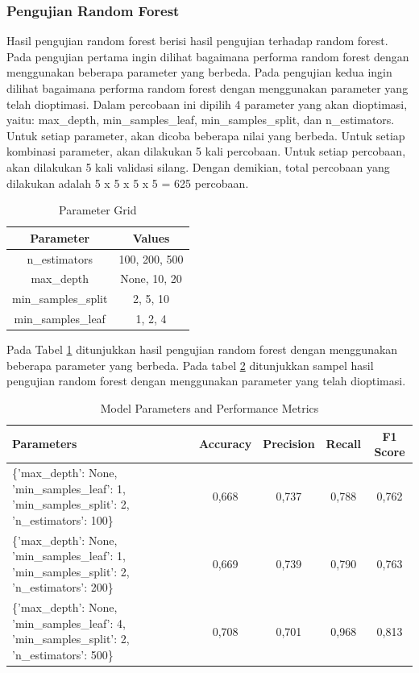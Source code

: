 \subsubsection{Pengujian Random Forest}
Hasil pengujian random forest berisi hasil pengujian terhadap random forest. Pada pengujian pertama ingin dilihat bagaimana performa random forest dengan menggunakan beberapa parameter yang berbeda. Pada pengujian kedua ingin dilihat bagaimana performa random forest dengan menggunakan parameter yang telah dioptimasi.
Dalam percobaan ini dipilih 4 parameter yang akan dioptimasi, yaitu: max\_depth, min\_samples\_leaf, min\_samples\_split, dan n\_estimators. Untuk setiap parameter, akan dicoba beberapa nilai yang berbeda. Untuk setiap kombinasi parameter, akan dilakukan 5 kali percobaan. Untuk setiap percobaan, akan dilakukan 5 kali validasi silang. Dengan demikian, total percobaan yang dilakukan adalah 5 x 5 x 5 x 5 = 625 percobaan.

\begin{table}[h]
    \centering
    \begin{tabular}{|c|c|}
    \hline
    \textbf{Parameter} & \textbf{Values} \\
    \hline
    n\_estimators & 100, 200, 500 \\
    \hline
    max\_depth & None, 10, 20 \\
    \hline
    min\_samples\_split & 2, 5, 10 \\
    \hline
    min\_samples\_leaf & 1, 2, 4 \\
    \hline
    \end{tabular}
    \caption{Parameter Grid}
    \label{table:param_grid}
    \end{table}

Pada Tabel \ref{table:param_grid} ditunjukkan hasil pengujian random forest dengan menggunakan beberapa parameter yang berbeda. Pada tabel \ref{table:sampel_hasil_pengujian_random_forest} ditunjukkan sampel hasil pengujian random forest dengan menggunakan parameter yang telah dioptimasi.


\begin{table}[h]
    \centering
    \begin{tabularx}{\textwidth}{|X|c|c|c|c|}
    \hline
    \textbf{Parameters} & \textbf{Accuracy} & \textbf{Precision} & \textbf{Recall} & \textbf{F1 Score} \\
    \hline
    \{'max\_depth': None, 'min\_samples\_leaf': 1, 'min\_samples\_split': 2, 'n\_estimators': 100\} & 0,668 & 0,737 & 0,788 & 0,762 \\
    \hline
    \{'max\_depth': None, 'min\_samples\_leaf': 1, 'min\_samples\_split': 2, 'n\_estimators': 200\} & 0,669 & 0,739 & 0,790 & 0,763 \\
    \hline
    \{'max\_depth': None, 'min\_samples\_leaf': 4, 'min\_samples\_split': 2, 'n\_estimators': 500\} & 0,708 & 0,701 & 0,968 & 0,813 \\
    \hline
    \end{tabularx}
    \caption{Model Parameters and Performance Metrics}
    \label{table:sampel_hasil_pengujian_random_forest}
\end{table}

